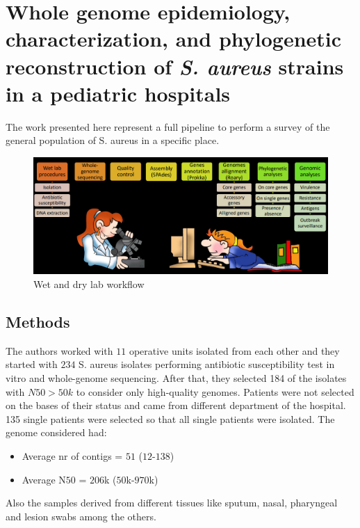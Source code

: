 \section{Whole genome epidemiology, characterization, and phylogenetic reconstruction of \emph{S. aureus} strains in a pediatric hospitals}
The work presented here represent a full pipeline to perform a survey of the general population of S. aureus in a specific place.

\begin{figure}[h]
\centering
\caption{}
\includegraphics[width=1.0\textwidth]{Workflow.png}
\caption{Wet and dry lab workflow}
\end{figure}

    \subsection{Methods}
    The authors worked with $11$ operative units isolated from each other and they started with $234$ S. aureus isolates performing antibiotic susceptibility test in vitro and whole-genome sequencing.
    After that, they selected 184 of the isolates  with $N50>50k$ to consider only high-quality genomes.
    Patients were not selected on the bases of their status and came from different department of the hospital.
    135 single patients were selected so that all single patients were isolated.
    The genome considered had:

    \begin{multicols}{2}
        \begin{itemize}
            \item Average nr of contigs = $51$ ($12$-$138$)
            \item Average N$50$ = $206$k ($50$k-$970$k)
        \end{itemize}
    \end{multicols}

    Also the samples derived from different tissues like sputum, nasal,  pharyngeal and lesion swabs among the others.

